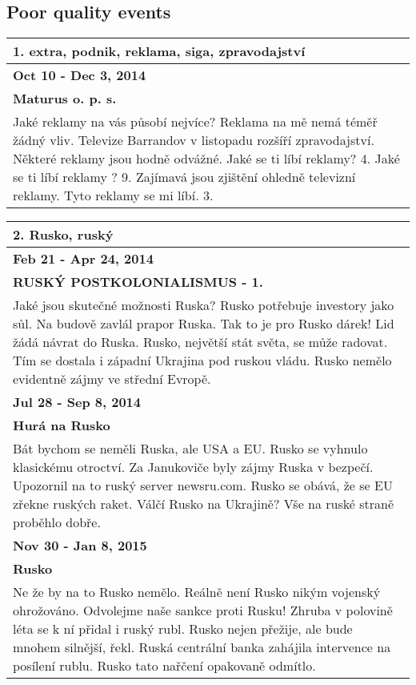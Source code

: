\subsection*{Poor quality events}

\begin{tabularx}{\linewidth}{p{\linewidth}} \toprule[1.5pt]
\bf 1. extra, podnik, reklama, siga, zpravodajství \\ \midrule
\bf Oct 10 - Dec 3, 2014 \\ \midrule
\bf Maturus o. p. s. \\
Jaké reklamy na vás působí nejvíce? Reklama na mě nemá téměř žádný vliv. Televize Barrandov v listopadu rozšíří zpravodajství. Některé reklamy jsou hodně odvážné. Jaké se ti líbí reklamy? 4. Jaké se ti líbí reklamy ? 9. Zajímavá jsou zjištění ohledně televizní reklamy. Tyto reklamy se mi líbí. 3. \\ \bottomrule[1.25pt]
\end{tabularx}

\par

\begin{tabularx}{\linewidth}{p{\linewidth}} \toprule[1.5pt]
\bf 2. Rusko, ruský \\ \midrule
\bf Feb 21 - Apr 24, 2014 \\ \midrule
\bf RUSKÝ POSTKOLONIALISMUS - 1. \\
Jaké jsou skutečné možnosti Ruska? Rusko potřebuje investory jako sůl. Na budově zavlál prapor Ruska. Tak to je pro Rusko dárek! Lid žádá návrat do Ruska. Rusko, největší stát světa, se může radovat. Tím se dostala i západní Ukrajina pod ruskou vládu. Rusko nemělo evidentně zájmy ve střední Evropě. \\ \bottomrule[1.25pt]

\bf Jul 28 - Sep 8, 2014 \\ \midrule
\bf Hurá na Rusko \\
Bát bychom se neměli Ruska, ale USA a EU. Rusko se vyhnulo klasickému otroctví. Za Janukoviče byly zájmy Ruska v bezpečí. Upozornil na to ruský server newsru.com. Rusko se obává, že se EU zřekne ruských raket. Válčí Rusko na Ukrajině? Vše na ruské straně proběhlo dobře. \\ \bottomrule[1.25pt]

\bf Nov 30 - Jan 8, 2015 \\ \midrule
\bf Rusko \\
Ne že by na to Rusko nemělo. Reálně není Rusko nikým vojenský ohrožováno. Odvolejme naše sankce proti Rusku! Zhruba v polovině léta se k ní přidal i ruský rubl. Rusko nejen přežije, ale bude mnohem silnější, řekl. Ruská centrální banka zahájila intervence na posílení rublu. Rusko tato nařčení opakovaně odmítlo. \\ \bottomrule[1.25pt]
\end{tabularx}


\par